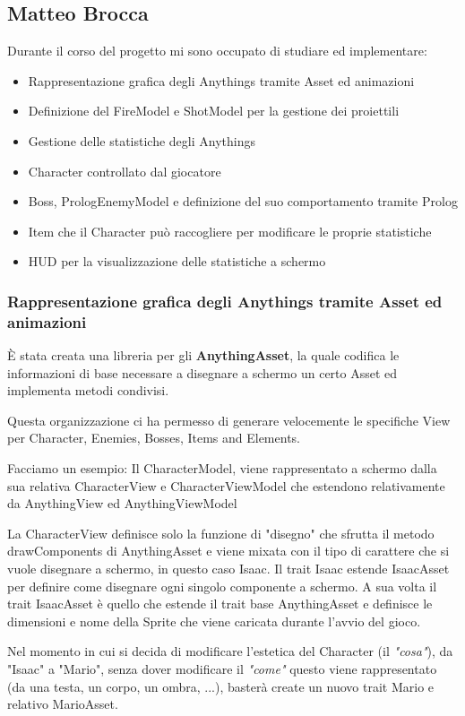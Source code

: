 \subsection{Matteo Brocca}
Durante il corso del progetto mi sono occupato di studiare ed implementare:
\begin{itemize}
	\item Rappresentazione grafica degli Anythings tramite Asset ed animazioni
    \item Definizione del FireModel e ShotModel per la gestione dei proiettili
    \item Gestione delle statistiche degli Anythings
    \item Character controllato dal giocatore
    \item Boss, PrologEnemyModel e definizione del suo comportamento tramite Prolog
    \item Item che il Character può raccogliere per modificare le proprie statistiche
    \item HUD per la visualizzazione delle statistiche a schermo
\end{itemize}

\subsubsection{Rappresentazione grafica degli Anythings tramite Asset ed animazioni}
È stata creata una libreria per gli \textbf{AnythingAsset}, 
la quale codifica le informazioni di base necessare a disegnare a schermo un certo Asset ed implementa metodi condivisi. 

Questa organizzazione ci ha permesso di generare velocemente le specifiche View per Character, Enemies, Bosses, Items and Elements.

Facciamo un esempio:
Il CharacterModel, viene rappresentato a schermo dalla sua relativa CharacterView e CharacterViewModel 
che estendono relativamente da AnythingView ed AnythingViewModel

La CharacterView definisce solo la funzione di "disegno" che sfrutta il metodo drawComponents di AnythingAsset 
e viene mixata con il tipo di carattere che si vuole disegnare a schermo, in questo caso Isaac.
Il trait Isaac estende IsaacAsset per definire come disegnare ogni singolo componente a schermo.
A sua volta il trait IsaacAsset è quello che estende il trait base AnythingAsset 
e definisce le dimensioni e nome della Sprite che viene caricata durante l'avvio del gioco.

Nel momento in cui si decida di modificare l'estetica del Character (il \textit{"cosa"}), da "Isaac" a "Mario",
senza dover modificare il \textit{"come"} questo viene rappresentato (da una testa, un corpo, un ombra, ...),
basterà create un nuovo trait Mario e relativo MarioAsset.

